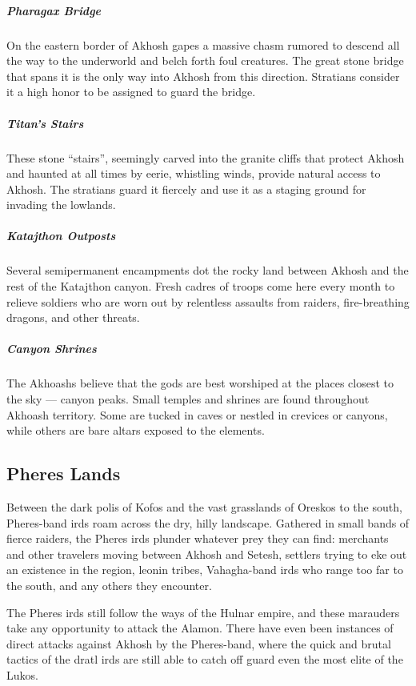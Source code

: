         \subparagraph{Pharagax Bridge} On the eastern border of Akhosh gapes a massive chasm rumored to descend all the way to the underworld and belch forth foul creatures.
        The great stone bridge that spans it is the only way into Akhosh from this direction.
        Stratians consider it a high honor to be assigned to guard the bridge.

        \subparagraph{Titan's Stairs} These stone ``stairs'', seemingly carved into the granite cliffs that protect Akhosh and haunted at all times by eerie, whistling winds, provide natural access to Akhosh.
        The stratians guard it fiercely and use it as a staging ground for invading the lowlands.

        \subparagraph{Katajthon Outposts} Several semipermanent encampments dot the rocky land between Akhosh and the rest of the Katajthon canyon.
        Fresh cadres of troops come here every month to relieve soldiers who are worn out by relentless assaults from raiders, fire-breathing dragons, and other threats.

        \subparagraph{Canyon Shrines} The Akhoashs believe that the gods are best worshiped at the places closest to the sky --- canyon peaks.
        Small temples and shrines are found throughout Akhoash territory.
        Some are tucked in caves or nestled in crevices or canyons, while others are bare altars exposed to the elements.

\subsection*{Pheres Lands}
    Between the dark polis of Kofos and the vast grasslands of Oreskos to the south, Pheres-band irds roam across the dry, hilly landscape.
    Gathered in small bands of fierce raiders, the Pheres irds plunder whatever prey they can find: merchants and other travelers moving between Akhosh and Setesh, settlers trying to eke out an existence in the region, leonin tribes, Vahagha-band irds who range too far to the south, and any others they encounter.

    The Pheres irds still follow the ways of the Hulnar empire, and these marauders take any opportunity to attack the Alamon.
    There have even been instances of direct attacks against Akhosh by the Pheres-band, where the quick and brutal tactics of the dratl irds are still able to catch off guard even the most elite of the Lukos.

